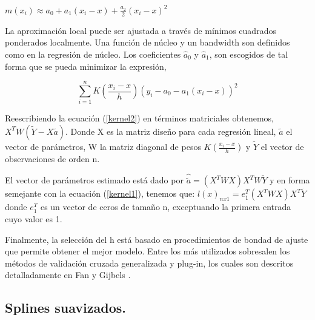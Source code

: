 \begin{center}
$\displaystyle{m(x_{i}) \approx  a_{0} + a_{1}(x_{i}-x) + \frac{a_{2}}{2}(x_{i}-x)^2}$
\end{center}

\vspace*{0.2 cm}

\hspace*{0.4 cm} La aproximaci\'on local puede ser ajustada a trav\'es de m\'inimos cuadrados ponderados localmente. Una funci\'on de n\'ucleo y un bandwidth son definidos como en la regresi\'on de n\'ucleo. Los coeficientes $\hat{a}_{0}$ y $\hat{a}_{1}$, son escogidos de tal forma que se pueda minimizar la expresi\'on,

\vspace*{0.2 cm}

\begin{equation}
 \sum_{i=1}^{n} K(\frac{x_{i}-x}{h}) (y_{i}-a_{0}-a_{1}(x_{i}-x))^2 
 \label{kernel2}
\end{equation}

\vspace*{0.2 cm}


\hspace*{0.4 cm} Reescribiendo la ecuaci\'on (\ref{kernel2}) en t\'erminos matriciales obtenemos, $X^{T}W(\tilde{Y}-X \tilde{a})$. Donde X es la matriz dise\~no para cada regresi\'on lineal, $\tilde{a}$ el vector de
par\'ametros, W la matriz diagonal de pesos $K(\frac{x_{i}-x}{h})$ y $\tilde{Y}$ el vector de observaciones de orden n.


\hspace*{0.4 cm} El vector de par\'ametros estimado est\'a dado por $ \hat{\tilde{a}} = (X^{T}WX)X^{T}W \tilde{Y} $
y en forma semejante con la ecuaci\'on (\ref{kernel1}), tenemos que: $l(x)_{nx1} = e_{1}^{T} (X^{T}WX)X^{T} \tilde{Y}$ donde $e_{1}^{T}$
es un vector de ceros de tama\~no n, exceptuando la primera entrada cuyo valor es 1.

\hspace*{0.4 cm}Finalmente, la selecci\'on del h est\'a basado en procedimientos de bondad de ajuste que permite obtener el mejor modelo. Entre los m\'as utilizados sobresalen los m\'etodos de validaci\'on cruzada generalizada y plug-in, los cuales son descritos detalladamente en Fan y Gijbels \cite{FG}.

\subsection{Splines suavizados.\\}

